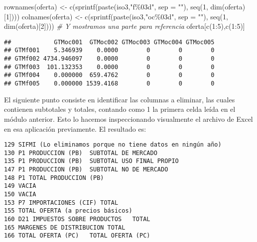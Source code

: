 \documentclass[
]{article}
\newenvironment{Shaded}{\begin{snugshade}}{\end{snugshade}}
\newcommand{\AttributeTok}[1]{\textcolor[rgb]{0.77,0.63,0.00}{#1}}
\newcommand{\CommentTok}[1]{\textcolor[rgb]{0.56,0.35,0.01}{\textit{#1}}}
\newcommand{\DecValTok}[1]{\textcolor[rgb]{0.00,0.00,0.81}{#1}}
\newcommand{\FunctionTok}[1]{\textcolor[rgb]{0.00,0.00,0.00}{#1}}
\newcommand{\NormalTok}[1]{#1}
\newcommand{\OtherTok}[1]{\textcolor[rgb]{0.56,0.35,0.01}{#1}}
\newcommand{\SpecialCharTok}[1]{\textcolor[rgb]{0.00,0.00,0.00}{#1}}
\newcommand{\StringTok}[1]{\textcolor[rgb]{0.31,0.60,0.02}{#1}}
\begin{document}
\begin{Shaded}
\begin{Highlighting}[]
\FunctionTok{rownames}\NormalTok{(oferta) }\OtherTok{\textless{}{-}} \FunctionTok{c}\NormalTok{(}\FunctionTok{sprintf}\NormalTok{(}\FunctionTok{paste}\NormalTok{(iso3,}\StringTok{"f\%03d"}\NormalTok{,  }\AttributeTok{sep =} \StringTok{""}\NormalTok{), }
                              \FunctionTok{seq}\NormalTok{(}\DecValTok{1}\NormalTok{, }\FunctionTok{dim}\NormalTok{(oferta)[}\DecValTok{1}\NormalTok{])))}
\FunctionTok{colnames}\NormalTok{(oferta) }\OtherTok{\textless{}{-}} \FunctionTok{c}\NormalTok{(}\FunctionTok{sprintf}\NormalTok{(}\FunctionTok{paste}\NormalTok{(iso3,}\StringTok{"oc\%03d"}\NormalTok{, }\AttributeTok{sep =} \StringTok{""}\NormalTok{), }
                              \FunctionTok{seq}\NormalTok{(}\DecValTok{1}\NormalTok{, }\FunctionTok{dim}\NormalTok{(oferta)[}\DecValTok{2}\NormalTok{])))}
\CommentTok{\# Y mostramos una parte para referencia}
\NormalTok{oferta[}\FunctionTok{c}\NormalTok{(}\DecValTok{1}\SpecialCharTok{:}\DecValTok{5}\NormalTok{),}\FunctionTok{c}\NormalTok{(}\DecValTok{1}\SpecialCharTok{:}\DecValTok{5}\NormalTok{)]}
\end{Highlighting}
\end{Shaded}

\begin{verbatim}
##            GTMoc001  GTMoc002 GTMoc003 GTMoc004 GTMoc005
## GTMf001    5.346939    0.0000        0        0        0
## GTMf002 4734.946097    0.0000        0        0        0
## GTMf003  101.132353    0.0000        0        0        0
## GTMf004    0.000000  659.4762        0        0        0
## GTMf005    0.000000 1539.4168        0        0        0
\end{verbatim}

El siguiente punto consiste en identificar las columnas a eliminar, las
cuales contienen subtotales y totales, contando como 1 la primera celda
leída en el módulo anterior. Esto lo hacemos inspeccionando visualmente
el archivo de Excel en esa aplicación previamente. El resultado es:

\begin{verbatim}
129 SIFMI (Lo eliminamos porque no tiene datos en ningún año)
130 P1 PRODUCCION (PB)  SUBTOTAL DE MERCADO
135 P1 PRODUCCION (PB)  SUBTOTAL USO FINAL PROPIO
147 P1 PRODUCCION (PB)  SUBTOTAL NO DE MERCADO
148 P1 TOTAL PRODUCCION (PB)
149 VACIA
150 VACIA
153 P7 IMPORTACIONES (CIF) TOTAL
155 TOTAL OFERTA (a precios básicos)
160 D21 IMPUESTOS SOBRE PRODUCTOS   TOTAL
165 MARGENES DE DISTRIBUCION TOTAL
166 TOTAL OFERTA (PC)   TOTAL OFERTA (PC)
\end{verbatim}
\end{document}
